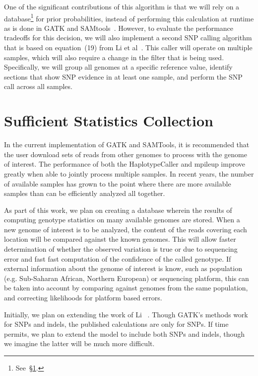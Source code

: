\documentclass[11pt]{article}
\begin{document}
One of the significant contributions of this algorithm is that we will rely on a database\footnote{See~\S\ref{sec:sufficient-statistics}.}
for prior probabilities, instead of performing this calculation at runtime as is done in GATK and SAMtools~\cite{mckenna10, li11}.
However, to evaluate the performance tradeoffs for this decision, we will also implement a second SNP calling algorithm that is
based on equation~(19) from Li et al~\cite{li11}. This caller will operate on multiple samples, which will also require a change in
the filter that is being used. Specifically, we will group all genomes at a specific reference value, identify sections that show SNP
evidence in at least one sample, and perform the SNP call across all samples.

\section{Sufficient Statistics Collection}
\label{sec:sufficient-statistics}

In the current implementation of GATK and SAMTools, it is recommended that the user download sets of reads from other genomes
to process with the genome of interest. The performance of both the HaplotypeCaller and mpileup improve greatly when able
to jointly process multiple samples. In recent years, the number of available samples has grown to the point where there are
more available samples than can be efficiently analyzed all together.

As part of this work, we plan on creating a database wherein the results of computing genotype statistics on many available genomes
are stored. When a new genome of interest is to be analyzed, the content of the reads covering each location will be compared against
the known genomes. This will allow faster determination of whether the observed variation is true or due to sequencing error and
fast fast computation of the confidence of the called genotype. If external information about the genome of interest is know, such as
population (e.g. Sub-Saharan African, Northern European) or sequencing platform, this can be taken into account by comparing
against genomes from the same population, and correcting likelihoods for platform based errors. 

Initially, we plan on extending the work of Li ~\cite{Li11}. Though GATK's methods work for SNPs and indels, the published calculations
are only for SNPs. If time permits, we plan to extend the model to include both SNPs and indels, though we imagine the latter will be much
more difficult.
\end{document}
